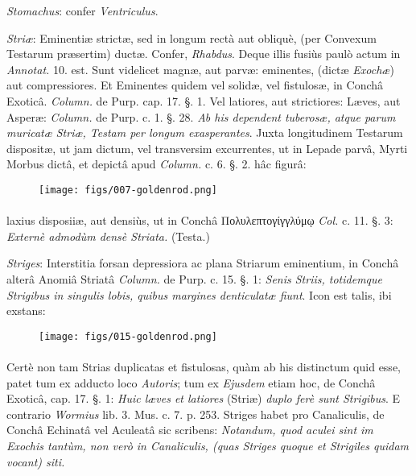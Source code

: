 \documentclass[a4paper, 11pt, oneside, polutonikogreek, german]{article}
\begin{document}
\emph{Stomachus}: confer \emph{Ventriculus}.

\emph{Striæ}: Eminentiæ strictæ, sed in longum rectà aut obliquè, (per Convexum Testarum præsertim) ductæ. Confer, \emph{Rhabdus}. Deque illis fusiùs paulò actum in \emph{Annotat.} 10. est. Sunt videlicet magnæ, aut parvæ: eminentes, (dictæ \emph{Exochæ}) aut compressiores. Et Eminentes quidem vel solidæ, vel fistulosæ, in Conchâ Exoticâ. \emph{Column.} de Purp. cap. 17. §. 1. Vel latiores, aut strictiores: Læves, aut Asperæ: \emph{Column.} de Purp. c. 1. §. 28. \emph{Ab his dependent tuberosæ, atque parum muricatæ Striæ, Testam per longum exasperantes}. Juxta longitudinem Testarum dispositæ, ut jam dictum, vel transversim excurrentes, ut in Lepade parvâ, Myrti Morbus dictâ, et depictâ apud \emph{Column.} c. 6. §. 2. hâc figurâ:

\begin{figure}[H]
\centering
\texttt{[image: figs/007-goldenrod.png]}
\end{figure}
\paragraph{}
laxius disposiiæ, aut densiùs, ut in Conchâ Πολυλεπτογίγγλύμῳ \emph{Col.} c. 11. §. 3: \emph{Externè admodùm densè Striata.} (Testa.)

\emph{Striges}: Interstitia forsan depressiora ac plana Striarum eminentium, in Conchâ alterâ Anomiâ Striatâ \emph{Column.} de Purp. c. 15. §. 1: \emph{Senis Striis, totidemque Strigibus in singulis lobis, quibus margines denticulatæ fiunt}. Icon est talis, ibi exstans:

\begin{figure}[H]
\centering
\texttt{[image: figs/015-goldenrod.png]}
\end{figure}
\paragraph{}
Certè non tam Strias duplicatas et fistulosas, quàm ab his distinctum quid esse, patet tum ex adducto loco \emph{Autoris}; tum ex \emph{Ejusdem} etiam hoc, de Conchâ Exoticâ, cap. 17. §. 1: \emph{Huic læves et latiores} (Striæ) \emph{duplo ferè sunt Strigibus}. E contrario \emph{Wormius} lib. 3. Mus. c. 7. p. 253. Striges habet pro Canaliculis, de Conchâ Echinatâ vel Aculeatâ sic scribens: \emph{Notandum, quod aculei sint im Exochis tantùm, non verò in Canaliculis, (quas Striges quoque et Strigiles quidam vocant) siti.}
\end{document}
